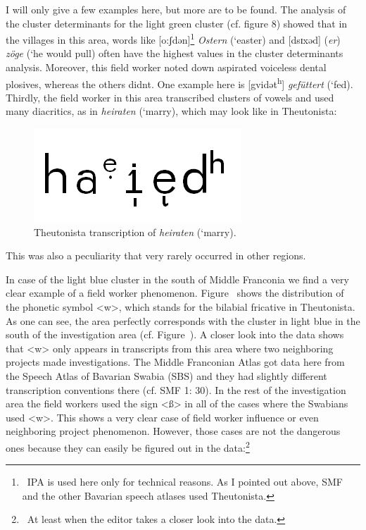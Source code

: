 \documentclass[output=paper]{LSP/langsci}
\begin{document}
I will only give a few examples here, but more are to be found. The analysis of the cluster determinants for the light green cluster (cf. figure 8) showed that in the villages in this area, words like [o:ʃdən]\footnote{\ IPA is used here only for technical reasons. As I pointed out above, SMF and the other Bavarian speech atlases used Theutonista.} \textit{Ostern} (`easter{\textquotesingle}) and [dsɪxəd] (\textit{er}) \textit{zöge} (`he would pull{\textquotesingle}) often have the highest values in the cluster determinants{\textquotesingle} analysis. Moreover, this field worker noted down aspirated voiceless dental plosives, whereas the others didn{\textquotesingle}t. One example here is [gvidət\textsuperscript{h}] \textit{gefüttert} (`fed{\textquotesingle}). Thirdly, the field worker in this area transcribed clusters of vowels and used many diacritics, as in \textit{heiraten} (`marry{\textquotesingle}), which may look like  in Theutonista:

\begin{figure}
\includegraphics[width=.25\textwidth]{illustrations/mathus_fig9}
\caption{Theutonista transcription of \textit{heiraten} (`marry{\textquotesingle}).}
\label{fig:9}
\end{figure}

This was also a peculiarity that very rarely occurred in other regions.

In case of the light blue cluster in the south of Middle Franconia we find a very clear example of a field worker phenomenon. Figure~ shows the distribution of the phonetic symbol {\textless}w{\textgreater}, which stands for the bilabial fricative in Theutonista. As one can see, the area perfectly corresponds with the cluster in light blue in the south of the investigation area (cf. Figure~). A closer look into the data shows that {\textless}w{\textgreater} only appears in transcripts from this area where two neighboring projects made investigations. The Middle Franconian Atlas got data here from the Speech Atlas of Bavarian Swabia (SBS) and they had slightly different transcription conventions there (cf. SMF 1: 30). In the rest of the investigation area the field workers used the sign {\textless}ß{\textgreater} in all of the cases where the Swabians used {\textless}w{\textgreater}. This shows a very clear case of field worker influence or even neighboring project phenomenon. However, those cases are not the dangerous ones because they can easily be figured out in the data:\footnote{\ At least when the editor takes a closer look into the data.}
\end{document}
